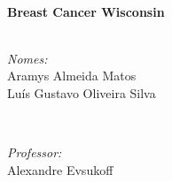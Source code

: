 \begin{titlepage}

\HRule 
\\[0.8cm]
{ \huge \bfseries  Breast Cancer Wisconsin  }\\[0.4cm] %
\HRule \\[1.5cm]
 

\begin{minipage}{0.4\textwidth}
\begin{flushleft} \large
\emph{Nomes:}\\
Aramys Almeida Matos \\
Luís Gustavo Oliveira Silva 
\end{flushleft}
\end{minipage}
~
\begin{minipage}{0.4\textwidth}
\begin{flushright} \large
\emph{Professor:} \\
Alexandre Evsukoff  %
\end{flushright}
\end{minipage}\\[4cm]



\vspace*{\fill}
\end{titlepage}